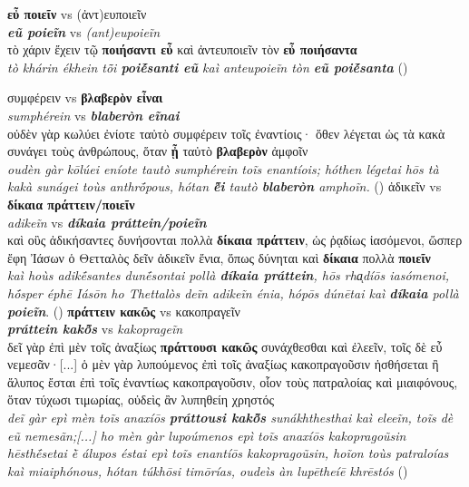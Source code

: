 \documentclass[output=paper,colorlinks,citecolor=brown]{langscibook}
\begin{document}
\ex \label{Ex7}
    \textbf{εὖ ποιεῖν} vs (ἀντ)ευποιεῖν\\
    \textit{\textbf{eũ poieĩn}} vs \textit{(ant)eupoieĩn} \\\medskip
τὸ χάριν ἔχειν τῷ \textbf{ποιήσαντι εὖ} καὶ ἀντευποιεῖν τὸν \textbf{εὖ ποιήσαντα}\\
\textit{tò khárin ékhein tō̃i \textbf{poiḗsanti eũ} kaì anteupoieĩn tòn \textbf{eũ poiḗsanta}} 
\hspace*{\fill}()

\newpage
\ex \label{Ex8}
    συμφέρειν vs \textbf{βλαβερὸν εἶναι} \\
    \textit{sumphérein} vs \textit{\textbf{blaberòn eĩnai}} \\\medskip
    οὐδὲν γὰρ κωλύει ἐνίοτε ταὐτὸ συμφέρειν τοῖς ἐναντίοις· ὅθεν λέγεται ὡς τὰ κακὰ συνάγει τοὺς ἀνθρώπους, ὅταν \textbf{ᾖ} ταὐτὸ \textbf{βλαβερὸν} ἀμφοῖν \\
    \textit{oudèn gàr kōlúei eníote tautò sumphérein toĩs enantíois; hóthen légetai hōs tà kakà sunágei toùs anthrṓpous, hótan \textbf{ē̃i} tautò \textbf{blaberòn} amphoĩn.} 
    \hspace*{\fill}()
\ex \label{Ex9}
    ἀδικεῖν vs \textbf{δίκαια πράττειν/ποιεῖν} \\
 \textit{adikeĩn} vs \textit{\textbf{díkaia práttein/poieĩn}} \\\medskip
 καὶ οὓς ἀδικήσαντες δυνήσονται πολλὰ \textbf{δίκαια πράττειν}, ὡς ῥᾳδίως ἰασόμενοι, ὥσπερ ἔφη Ἰάσων ὁ Θετταλὸς δεῖν ἀδικεῖν ἔνια, ὅπως δύνηται καὶ \textbf{δίκαια} πολλὰ \textbf{ποιεῖν} \\
 \textit{kaì hoùs adikḗsantes dunḗsontai pollà \textbf{díkaia práttein}, hōs rhaͅdíōs iasómenoi, hṓsper éphē Iásōn ho Thettalòs deĩn adikeĩn énia, hópōs dúnētai kaì \textbf{díkaia} pollà \textbf{poieĩn}}. 
 \hspace*{\fill}()
\ex \label{Ex10}
    \textbf{πράττειν κακῶς} vs κακοπραγεῖν \\
 \textit{\textbf{práttein kakō̃s}} vs \textit{kakoprageĩn} \\\medskip
 δεῖ γὰρ ἐπὶ μὲν τοῖς ἀναξίως \textbf{πράττουσι κακῶς} συνάχθεσθαι καὶ ἐλεεῖν, τοῖς δὲ εὖ νεμεσᾶν·[...] ὁ μὲν γὰρ λυπούμενος ἐπὶ τοῖς ἀναξίως κακοπραγοῦσιν ἡσθήσεται ἢ ἄλυπος ἔσται ἐπὶ τοῖς ἐναντίως κακοπραγοῦσιν, οἷον τοὺς πατραλοίας καὶ μιαιφόνους, ὅταν τύχωσι τιμωρίας, οὐδεὶς ἂν λυπηθείη χρηστός \\
 \textit{deĩ gàr epì mèn toĩs anaxíōs \textbf{práttousi kakō̃s} sunákhthesthai kaì eleeĩn, toĩs dè eũ nemesãn;[...] ho mèn gàr lupoúmenos epì toĩs anaxíōs kakopragoũsin hēsthḗsetai ḕ álupos éstai epì toĩs enantíōs kakopragoũsin, hoĩon toùs patraloías kaì miaiphónous, hótan túkhōsi timōrías, oudeìs àn lupētheíē khrēstós} 
 \hspace*{\fill}()
 \z
\z
\end{document}
